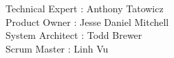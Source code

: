 Technical Expert : Anthony Tatowicz
\\Product Owner : Jesse Daniel Mitchell
\\System Architect : Todd Brewer
\\Scrum Master : Linh Vu
\\
\\
